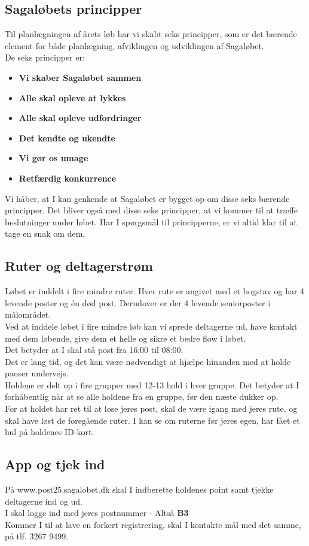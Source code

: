 \subsection{Sagaløbets principper}
Til planlægningen af årets løb har vi skabt seks principper, som er det bærende element for både planlægning, afviklingen og udviklingen af Sagaløbet.\\
De seks principper er:
\begin{itemize}
  \item \textbf{Vi skaber Sagaløbet sammen}
  \item \textbf{Alle skal opleve at lykkes}
  \item \textbf{Alle skal opleve udfordringer}
  \item \textbf{Det kendte og ukendte}
  \item \textbf{Vi gør os umage}
  \item \textbf{Retfærdig konkurrence}
\end{itemize}
Vi håber, at I kan genkende at Sagaløbet er bygget op om disse seks bærende principper. Det bliver også med disse seks principper, at vi kommer til at træffe beslutninger under løbet. Har I spørgsmål til principperne, er vi altid klar til at tage en snak om dem.
\subsection{Ruter og deltagerstrøm}
Løbet er inddelt i fire mindre ruter. Hver rute er angivet med et bogstav og har 4 levende poster og én død post. Derudover er der 4 levende seniorposter i målområdet.\\
Ved at inddele løbet i fire mindre løb kan vi sprede deltagerne ud, have kontakt med dem løbende, give dem et helle og sikre et bedre flow i løbet.\\
\newline
Det betyder at I skal stå post fra 16:00 til 08:00.\\
Det er lang tid, og det kan være nødvendigt at hjælpe hinanden med at holde pauser undervejs.\\
\newline
Holdene er delt op i fire grupper med 12-13 hold i hver gruppe. Det betyder at I forhåbentlig når at se alle holdene fra en gruppe, før den næste dukker op.\\
For at holdet har ret til at løse jeres post, skal de være igang med jeres rute, og skal have løst de foregående ruter. I kan se om ruterne før jeres egen, har fået et hul på holdenes ID-kort.
\subsection{App og tjek ind}
På www.post25.sagalobet.dk skal I indberette holdenes point samt tjekke deltagerne ind og ud.\\
I skal logge ind med jeres postnummer - Altså \textbf{B3}\\
\newline
Kommer I til at lave en forkert registrering, skal I kontakte mål med det samme, på tlf. 3267 9499.
\newpage
\vspace*{.4cm}
